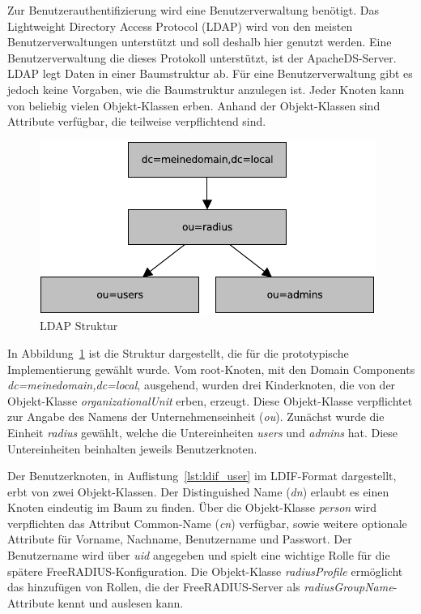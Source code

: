 \documentclass[11pt,a4paper]{report}
\begin{document}
Zur Benutzerauthentifizierung wird eine Benutzerverwaltung benötigt. Das Lightweight Directory Access Protocol (LDAP) wird von den meisten Benutzerverwaltungen unterstützt und soll deshalb hier genutzt werden. Eine Benutzerverwaltung die dieses Protokoll unterstützt, ist der ApacheDS-Server. LDAP legt Daten in einer Baumstruktur ab. Für eine Benutzerverwaltung gibt es jedoch keine Vorgaben, wie die Baumstruktur anzulegen ist. Jeder Knoten kann von beliebig vielen Objekt-Klassen erben. Anhand der Objekt-Klassen sind Attribute verfügbar, die teilweise verpflichtend sind. 
\begin{figure}[htbp]
\centering
\includegraphics[scale=1]{images/ldap_structure.pdf}
\caption{LDAP Struktur}
\label{fig:ldap_sturcture}
\end{figure}
In Abbildung~\ref{fig:ldap_sturcture} ist die Struktur dargestellt, die für die prototypische Implementierung gewählt wurde. Vom root-Knoten, mit den Domain Components \textit{dc=meinedomain,dc=local}, ausgehend, wurden drei Kinderknoten, die von der Objekt-Klasse \textit{organizationalUnit} erben, erzeugt. Diese Objekt-Klasse verpflichtet zur Angabe des Namens der Unternehmenseinheit (\textit{ou}). Zunächst wurde die Einheit \textit{radius} gewählt, welche die Untereinheiten \textit{users} und \textit{admins} hat. Diese Untereinheiten beinhalten jeweils Benutzerknoten.

Der Benutzerknoten, in Auflistung~\ref{lst:ldif_user} im LDIF-Format dargestellt, erbt von zwei Objekt-Klassen. Der Distinguished Name (\textit{dn}) erlaubt es einen Knoten eindeutig im Baum zu finden. Über die Objekt-Klasse \textit{person} wird verpflichten das Attribut Common-Name (\textit{cn}) verfügbar, sowie weitere optionale Attribute für Vorname, Nachname, Benutzername und Passwort. Der Benutzername wird über \textit{uid} angegeben und spielt eine wichtige Rolle für die spätere FreeRADIUS-Konfiguration. Die Objekt-Klasse \textit{radiusProfile} ermöglicht das hinzufügen von Rollen, die der FreeRADIUS-Server als \textit{radiusGroupName}-Attribute kennt und auslesen kann.
\end{document}
